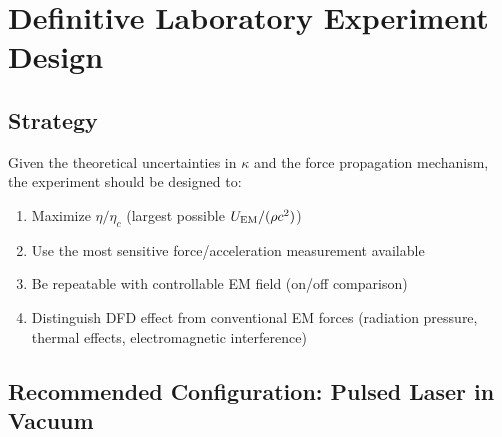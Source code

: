 \documentclass[12pt,a4paper]{article}
\begin{document}
\section{Definitive Laboratory Experiment Design}
\label{sec:experiment}

\subsection{Strategy}

Given the theoretical uncertainties in $\kappa$ and the force propagation
mechanism, the experiment should be designed to:
\begin{enumerate}
\item Maximize $\eta/\eta_c$ (largest possible $U_{\rm EM}/(\rho c^2)$)
\item Use the most sensitive force/acceleration measurement available
\item Be repeatable with controllable EM field (on/off comparison)
\item Distinguish DFD effect from conventional EM forces (radiation pressure,
  thermal effects, electromagnetic interference)
\end{enumerate}

\subsection{Recommended Configuration: Pulsed Laser in Vacuum}
\end{document}
